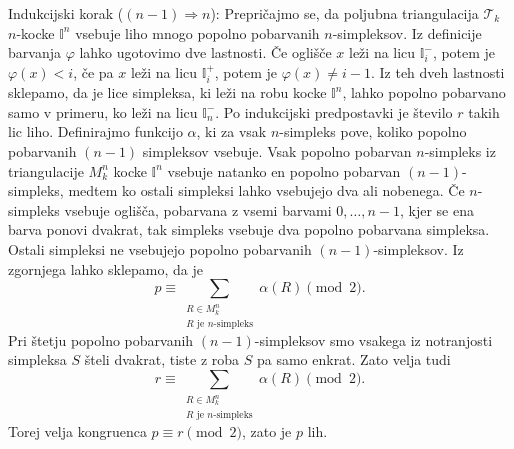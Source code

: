 \documentclass[mat1]{fmfdelo}
\newcommand{\I}{\mathbb I}
\newcommand{\0}{0}
\newcommand{\pT}{\mathcal T}
\begin{document}
\begin{dokaz}
Indukcijski korak ($(n - 1) \Longrightarrow n$):
Prepričajmo se, da poljubna triangulacija $\pT_k$ $n$-kocke $\I^n$ vsebuje liho mnogo popolno pobarvanih $n$-simpleksov. Iz definicije barvanja $\varphi$ lahko ugotovimo dve lastnosti. Če oglišče $x$ leži na licu $\I_i^-$, potem je $\varphi(x) < i$, če pa $x$ leži na licu $\I_i^+$, potem je $\varphi(x) \neq i -1$. Iz teh dveh lastnosti sklepamo, da je lice simpleksa, ki leži na robu kocke $\I^n$, lahko popolno pobarvano samo v primeru, ko leži na licu $\I_n^-$. Po indukcijski predpostavki je število $r$ takih lic liho. 
Definirajmo funkcijo $\alpha$, ki za vsak $n$-simpleks pove, koliko popolno pobarvanih $(n-1)$ simpleksov vsebuje. Vsak popolno pobarvan $n$-simpleks iz triangulacije $M_k^n$ kocke $\I^n$ vsebuje natanko en popolno pobarvan $(n-1)$-simpleks, medtem ko ostali simpleksi lahko vsebujejo dva ali nobenega. Če $n$-simpleks vsebuje oglišča, pobarvana z vsemi barvami $0, \dots, n-1$, kjer se ena barva ponovi dvakrat, tak simpleks vsebuje dva popolno pobarvana simpleksa. Ostali simpleksi ne vsebujejo popolno pobarvanih $(n - 1)$-simpleksov. Iz zgornjega lahko sklepamo, da je 
$$p \equiv 
\sum\limits_{\substack{
R \in M_k^n
 \\ 
R\text{ je } n\text{-simpleks}
 }}
  \alpha(R) \pmod 2.$$
Pri štetju popolno pobarvanih $(n - 1)$-simpleksov smo vsakega iz notranjosti simpleksa $S$ šteli dvakrat, tiste z roba $S$ pa samo enkrat. Zato velja tudi 
$$r \equiv 
\sum\limits_{\substack{
R \in M_k^n
 \\ 
R\text{ je } n\text{-simpleks}
 }}
  \alpha(R) \pmod 2.$$ 
Torej velja kongruenca $p \equiv r \pmod 2$, zato je $p$ lih.
\end{dokaz}
\end{document}
